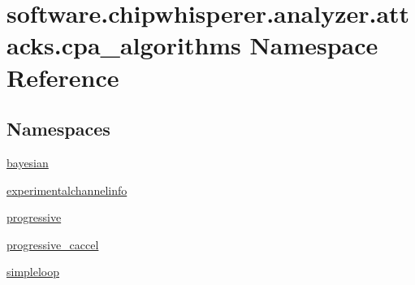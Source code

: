 \hypertarget{namespacesoftware_1_1chipwhisperer_1_1analyzer_1_1attacks_1_1cpa__algorithms}{}\section{software.\+chipwhisperer.\+analyzer.\+attacks.\+cpa\+\_\+algorithms Namespace Reference}
\label{namespacesoftware_1_1chipwhisperer_1_1analyzer_1_1attacks_1_1cpa__algorithms}
\subsection*{Namespaces}
\begin{DoxyCompactItemize}
\item 
 \hyperlink{namespacesoftware_1_1chipwhisperer_1_1analyzer_1_1attacks_1_1cpa__algorithms_1_1bayesian}{bayesian}
\item 
 \hyperlink{namespacesoftware_1_1chipwhisperer_1_1analyzer_1_1attacks_1_1cpa__algorithms_1_1experimentalchannelinfo}{experimentalchannelinfo}
\item 
 \hyperlink{namespacesoftware_1_1chipwhisperer_1_1analyzer_1_1attacks_1_1cpa__algorithms_1_1progressive}{progressive}
\item 
 \hyperlink{namespacesoftware_1_1chipwhisperer_1_1analyzer_1_1attacks_1_1cpa__algorithms_1_1progressive__caccel}{progressive\+\_\+caccel}
\item 
 \hyperlink{namespacesoftware_1_1chipwhisperer_1_1analyzer_1_1attacks_1_1cpa__algorithms_1_1simpleloop}{simpleloop}
\end{DoxyCompactItemize}
